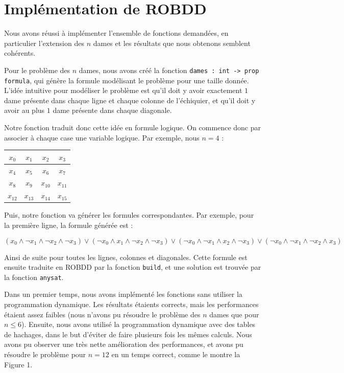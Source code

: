 \documentclass[a4paper,11pt]{article}
\begin{document}
		
	\section{Implémentation de ROBDD}
	
	Nous avons réussi à implémenter l'ensemble de fonctions demandées, en particulier l'extension des $n$ dames et les résultats que nous obtenons semblent cohérents.
	
	Pour le problème des $n$ dames, nous avons créé la fonction \texttt{dames : int -> prop formula}, qui génère la formule modélisant le problème pour une taille donnée. L'idée intuitive pour modéliser le problème est qu'il doit y avoir exactement $1$ dame présente dans chaque ligne et chaque colonne de l'échiquier, et qu'il doit y avoir au plus $1$ dame présente dans chaque diagonale. 
	
	Notre fonction traduit donc cette idée en formule logique. On commence donc par associer à chaque case une variable logique. Par exemple, nous $n = 4$ :
	
	\begin{center}
	\begin{tabular}{|*{4}{c|}}
	
            \hline
            $x_0$ & $x_1$ & $x_2$ & $x_3$ \\
            \hline
            $x_4$ & $x_5$ & $x_6$ & $x_7$ \\
            \hline
            $x_8$ & $x_9$ & $x_{10}$ & $x_{11}$ \\
            \hline
            $x_{12}$ & $x_{13}$ & $x_{14}$ & $x_{15}$ \\
            \hline
        \end{tabular}
        \end{center}
        
        Puis, notre fonction va générer les formules correspondantes. Par exemple, pour la première ligne, la formule générée est :
        
        $$(x_0 \land \neg x_1 \land \neg x_2 \land \neg x_3) \lor (\neg x_0 \land x_1 \land \neg x_2 \land \neg x_3) \lor (\neg x_0 \land \neg x_1 \land x_2 \land \neg x_3) \lor (\neg x_0 \land \neg x_1 \land \neg x_2 \land x_3)$$
        
        Ainsi de suite pour toutes les lignes, colonnes et diagonales. Cette formule est ensuite traduite en ROBDD par la fonction \texttt{build}, et une solution est trouvée par la fonction \texttt{anysat}.
	
	Dans un premier temps, nous avons implémenté les fonctions sans utiliser la programmation dynamique. Les résultats étaients corrects, mais les performances
	étaient assez faibles (nous n'avons pu résoudre le problème des $n$ dames que pour $n \leq 6$).
        Ensuite, nous avons utilisé la programmation dynamique avec des tables de hachages, dans le but d'éviter de faire plusieurs fois les mêmes calculs. Nous avons pu observer une très nette amélioration des performances, et avons pu résoudre le problème pour $n = 12$ en un temps correct, comme le montre la Figure 1.
        
\end{document}
